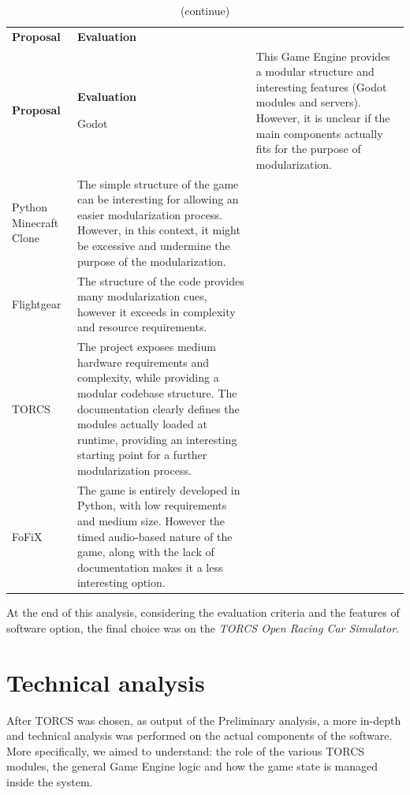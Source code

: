 
\newcommand{\coloredTableHead}{\rowcolor[HTML]{b61827}}
\newcommand{\lightTableRow}{\rowcolor{lightRowColor}}
\newcommand{\darkTableRow}{\rowcolor{darkRowColor}}

\def\arraystretch{1.75}
\begin{longtable}{ 
		>{\centering}p{} 
		>{}p{}}
	
	\caption{Summary of the analysis.} \\
	\coloredTableHead
	\textbf{\color{white}Proposal} & 
	\centering\textbf{\color{white}Evaluation}
	\endfirsthead
	
	\caption[]{(continue)}\\
	\coloredTableHead 
	\textbf{\color{white}Proposal} &
	\centering\textbf{\color{white}Evaluation}
	\endhead
	
	Godot & This Game Engine provides a modular structure and interesting features (Godot modules and servers). However, it is unclear if the main components actually fits for the purpose of modularization. \\
	Python Minecraft Clone & The simple structure of the game can be interesting for allowing an easier modularization process. However, in this context, it might be excessive and undermine the purpose of the modularization. \\
	Flightgear & The structure of the code provides many modularization cues, however it exceeds in complexity and resource requirements. \\
	TORCS & The project exposes medium hardware requirements and complexity, while providing a modular codebase structure. The documentation clearly defines the modules actually loaded at runtime, providing an interesting starting point for a further modularization process. \\
	FoFiX & The game is entirely developed in Python, with low requirements and medium size. However the timed audio-based nature of the game, along with the lack of documentation makes it a less interesting option.
\end{longtable}
At the end of this analysis, considering the evaluation criteria and the features of software option, the final choice was on the \textit{TORCS Open Racing Car Simulator}.

\section{Technical analysis}
After TORCS was chosen, as output of the Preliminary analysis, a more in-depth and technical analysis was performed on the actual components of the software. More specifically, we aimed to understand: the role of the various TORCS modules, the general Game Engine logic and how the game state is managed inside the system.

